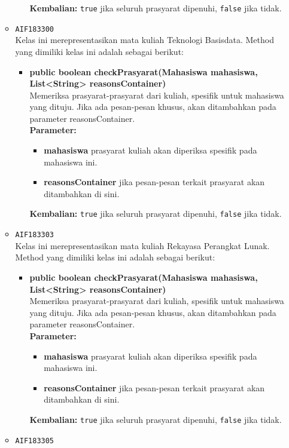 \begin{enumerate}
\begin{itemize}
\begin{itemize}
\textbf{Kembalian:} \texttt{true} jika seluruh prasyarat dipenuhi, \texttt{false} jika tidak.
\end{itemize}
\item \texttt{AIF183300} \\
Kelas ini merepresentasikan mata kuliah Teknologi Basisdata. Method yang dimiliki kelas ini adalah sebagai berikut: 
\begin{itemize}
\item \textbf{public boolean checkPrasyarat(Mahasiswa mahasiswa, List<String> reasonsContainer)}\\
Memeriksa prasyarat-prasyarat dari kuliah, spesifik untuk mahasiswa yang dituju. Jika ada pesan-pesan khusus, akan ditambahkan pada parameter reasonsContainer.\\
\textbf{Parameter:}
\begin{itemize}
\item \textbf{mahasiswa} prasyarat kuliah akan diperiksa spesifik pada mahasiswa ini.
\item \textbf{reasonsContainer} jika pesan-pesan terkait prasyarat akan ditambahkan di sini.
\end{itemize}
\textbf{Kembalian:} \texttt{true} jika seluruh prasyarat dipenuhi, \texttt{false} jika tidak.
\end{itemize}
\item \texttt{AIF183303} \\
Kelas ini merepresentasikan mata kuliah Rekayasa Perangkat Lunak. Method yang dimiliki kelas ini adalah sebagai berikut: 
\begin{itemize}
\item \textbf{public boolean checkPrasyarat(Mahasiswa mahasiswa, List<String> reasonsContainer)}\\
Memeriksa prasyarat-prasyarat dari kuliah, spesifik untuk mahasiswa yang dituju. Jika ada pesan-pesan khusus, akan ditambahkan pada parameter reasonsContainer.\\
\textbf{Parameter:}
\begin{itemize}
\item \textbf{mahasiswa} prasyarat kuliah akan diperiksa spesifik pada mahasiswa ini.
\item \textbf{reasonsContainer} jika pesan-pesan terkait prasyarat akan ditambahkan di sini.
\end{itemize}
\textbf{Kembalian:} \texttt{true} jika seluruh prasyarat dipenuhi, \texttt{false} jika tidak.
\end{itemize}
\item \texttt{AIF183305} \\

\end{itemize}
\end{enumerate}
